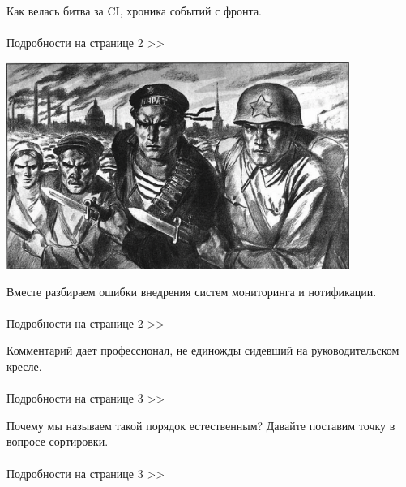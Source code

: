 \documentclass{article}
\date{\today}
\begin{document}
\maketitle

\begin{multicols}{3}

Как велась битва за CI, хроника событий с фронта.
\\\\Подробности на странице 2 >>
\closearticle

\includegraphics[width=11.2cm]{image.png}

\end{multicols}

\begin{multicols}{3}

Вместе разбираем ошибки внедрения систем мониторинга и нотификации.
\\\\Подробности на странице 2 >>
\vspace{14mm}
\closearticle

Комментарий дает профессионал, не единожды сидевший на руководительском кресле.
\\\\Подробности на странице 3 >>
\closearticle

Почему мы называем такой порядок естественным? Давайте поставим точку в вопросе сортировки.
\\\\Подробности на странице 3 >>
\closearticle

\end{multicols}
\end{document}
